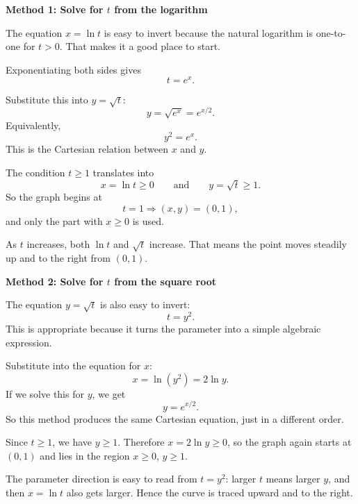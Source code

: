 \documentclass[a4paper,12pt,twocolumn]{article}
\newenvironment{solutionbox}{\begin{framed}}{\end{framed}}
\begin{document}
\begin{solutionbox}
\textbf{Method 1: Solve for \(t\) from the logarithm}

\begin{steps}
\item The equation \(x=\ln t\) is easy to invert because the natural logarithm is one-to-one for \(t>0\). That makes it a good place to start.

Exponentiating both sides gives
\[
t=e^x.
\]

\item Substitute this into \(y=\sqrt{t}\):
\[
y=\sqrt{e^x}=e^{x/2}.
\]
Equivalently,
\[
y^2=e^x.
\]
This is the Cartesian relation between \(x\) and \(y\).

\item The condition \(t\ge 1\) translates into
\[
x=\ln t\ge 0
\qquad\text{and}\qquad
y=\sqrt{t}\ge 1.
\]
So the graph begins at
\[
t=1 \Longrightarrow (x,y)=(0,1),
\]
and only the part with \(x\ge 0\) is used.

\item As \(t\) increases, both \(\ln t\) and \(\sqrt{t}\) increase. That means the point moves steadily up and to the right from \((0,1)\).
\end{steps}
\end{solutionbox}

\begin{solutionbox}
\textbf{Method 2: Solve for \(t\) from the square root}

\begin{steps}
\item The equation \(y=\sqrt{t}\) is also easy to invert:
\[
t=y^2.
\]
This is appropriate because it turns the parameter into a simple algebraic expression.

\item Substitute into the equation for \(x\):
\[
x=\ln(y^2)=2\ln y.
\]
If we solve this for \(y\), we get
\[
y=e^{x/2}.
\]
So this method produces the same Cartesian equation, just in a different order.

\item Since \(t\ge 1\), we have \(y\ge 1\). Therefore \(x=2\ln y\ge 0\), so the graph again starts at \((0,1)\) and lies in the region \(x\ge 0\), \(y\ge 1\).

\item The parameter direction is easy to read from \(t=y^2\): larger \(t\) means larger \(y\), and then \(x=\ln t\) also gets larger. Hence the curve is traced upward and to the right.
\end{steps}
\end{solutionbox}
\end{document}
